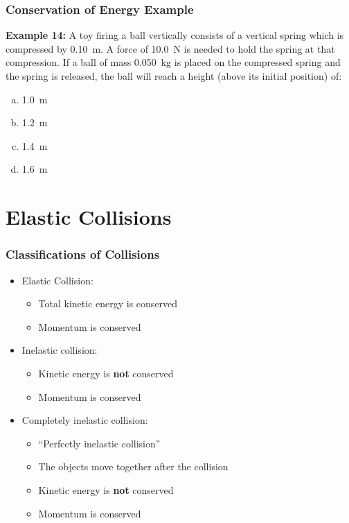 \documentclass[12pt,compress,aspectratio=169]{beamer}
\begin{document}
\begin{frame}
  \frametitle{Conservation of Energy Example}
  \textbf{Example 14:} A toy firing a ball vertically consists of a vertical
  spring which is compressed by \SI{0.10}{m}. A force of \SI{10.0}{\newton}
  is needed to hold the spring at that compression. If a ball of mass
  \SI{0.050}{kg} is placed on the compressed spring and the spring is released,
  the ball will reach a height (above its initial position) of:
  \begin{enumerate}[(a)]
  \item \SI{1.0}{m}
  \item \SI{1.2}{m}
  \item \SI{1.4}{m}
  \item \SI{1.6}{m}
  \end{enumerate}
\end{frame}


\section{Elastic Collisions}

\begin{frame}
  \frametitle{Classifications of Collisions}
  \begin{itemize}
  \item Elastic Collision:
    \begin{itemize}
    \item Total kinetic energy is conserved
    \item Momentum is conserved
    \end{itemize}
  \item Inelastic collision:
    \begin{itemize}
    \item Kinetic energy is \textbf{not} conserved
    \item Momentum is conserved
    \end{itemize}
  \item Completely inelastic collision:
    \begin{itemize}
    \item ``Perfectly inelastic collision''
    \item The objects move together after the collision
    \item Kinetic energy is \textbf{not} conserved
    \item Momentum is conserved
    \end{itemize}
  \end{itemize}
\end{frame}
\end{document}
